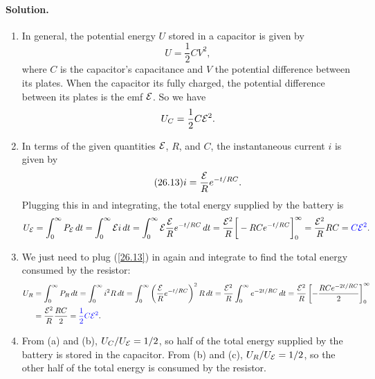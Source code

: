 \documentclass[11pt]{article}
\newcommand{\refeq}[1]{(\ref{#1})}
\newcommand{\beq}{\begin{equation*}}
\newcommand{\eeq}{\end{equation*}}
\newcommand{\beqn}{\begin{equation}}
\newcommand{\eeqn}{\end{equation}}
\newenvironment{solution}
{
    \paragraph{Solution.}
    \ignorespaces
}
{
    \bigskip
}
\begin{document}
\begin{solution}
	\begin{enumerate}
		\item In general, the potential energy $U$ stored in a capacitor is given by
		\beqn \tag{24.9}
			U = \frac{1}{2} C V^2,
		\eeqn
		where $C$ is the capacitor's capacitance and $V$ the potential difference between its plates.  When the capacitor its fully charged, the potential difference between its plates is the emf $\mathcal{E}$.  So we have
		{\color{blue} \beq
			\UC = \frac{1}{2} C \cE^2.
		\eeq }
		
		\vfill
	
		\item In terms of the given quantities $\mathcal{E}$, $R$, and $C$, the instantaneous current $i$ is given by
		\beq \label{26.13} \tag{26.13}
			i = \frac{\cE}{R} e^{-t / RC}.
		\eeq
		Plugging this in and integrating, the total energy supplied by the battery is
		\beq
			\UcE = \intoi \PcE \dt
			= \intoi \cE i \dt
			= \intoi \cE \frac{\cE}{R} e^{-t / RC} \dt
			= \frac{\cE^2}{R} \bigg[ - RC e^{-t / RC} \bigg]_0^\infty
			= \frac{\cE^2}{R} R C
			= {\color{blue} C \cE^2}.
		\eeq
		
		\vfill
		
		\item We just need to plug \refeq{26.13} in again and integrate to find the total energy consumed by the resistor:
		\begin{align*}
			U_R &= \int_0^\infty P_R \dd{t}
			= \int_0^\infty i^2 R \dd{t}
			= \int_0^\infty \left( \frac{\mathcal{E}}{R} e^{-t / RC} \right)^2 R \dd{t}
			= \frac{\mathcal{E}^2}{R} \int_0^\infty e^{-2t / RC} \dd{t}
			= \frac{\mathcal{E}^2}{R} \left[ -\frac{RC e^{-2t / RC}}{2} \right]_0^\infty \\
			&= \frac{\mathcal{E}^2}{R} \frac{RC}{2}
			= {\color{blue} \frac{1}{2} C \mathcal{E}^2}.
		\end{align*}
		
		\vfill
		
		\item From (a) and (b), $U_C / U_{\mathcal{E}} = 1/2$, so {\color{blue} half} of the total energy supplied by the battery is stored in the capacitor.  From (b) and (c), $U_R / U_{\mathcal{E}} = 1/2$, so the other {\color{blue} half} of the total energy is consumed by the resistor.
	\end{enumerate}
\end{solution}



\clearpage
\end{document}
